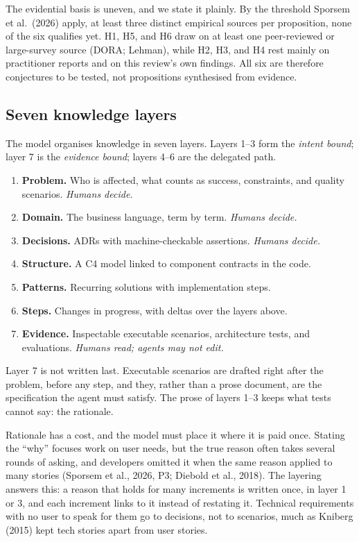 \documentclass[11pt]{article}
\begin{document}
The evidential basis is uneven, and we state it plainly. By the threshold Sporsem et al.\ (2026) apply, at least three distinct empirical sources per proposition, none of the six qualifies yet. H1, H5, and H6 draw on at least one peer-reviewed or large-survey source (DORA; Lehman), while H2, H3, and H4 rest mainly on practitioner reports and on this review's own findings. All six are therefore conjectures to be tested, not propositions synthesised from evidence.

\subsection{Seven knowledge layers}

The model organises knowledge in seven layers. Layers 1--3 form the \emph{intent bound}; layer 7 is the \emph{evidence bound}; layers 4--6 are the delegated path.

\begin{enumerate}[leftmargin=*]
  \item \textbf{Problem.} Who is affected, what counts as success, constraints, and quality scenarios. \emph{Humans decide.}
  \item \textbf{Domain.} The business language, term by term. \emph{Humans decide.}
  \item \textbf{Decisions.} ADRs with machine-checkable assertions. \emph{Humans decide.}
  \item \textbf{Structure.} A C4 model linked to component contracts in the code.
  \item \textbf{Patterns.} Recurring solutions with implementation steps.
  \item \textbf{Steps.} Changes in progress, with deltas over the layers above.
  \item \textbf{Evidence.} Inspectable executable scenarios, architecture tests, and evaluations. \emph{Humans read; agents may not edit.}
\end{enumerate}

Layer 7 is not written last. Executable scenarios are drafted right after the problem, before any step, and they, rather than a prose document, are the specification the agent must satisfy. The prose of layers 1--3 keeps what tests cannot say: the rationale.

Rationale has a cost, and the model must place it where it is paid once. Stating the ``why'' focuses work on user needs, but the true reason often takes several rounds of asking, and developers omitted it when the same reason applied to many stories (Sporsem et al., 2026, P3; Diebold et al., 2018). The layering answers this: a reason that holds for many increments is written once, in layer 1 or 3, and each increment links to it instead of restating it. Technical requirements with no user to speak for them go to decisions, not to scenarios, much as Kniberg (2015) kept tech stories apart from user stories.
\end{document}

